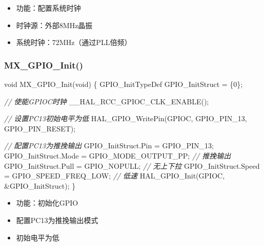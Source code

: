 \documentclass[
  chinese,
  UTF8,
  oneside,
  openany]{ctexbook}
\newenvironment{Shaded}{}{}
\newcommand{\CommentTok}[1]{\textcolor[rgb]{0.38,0.63,0.69}{\textit{#1}}}
\newcommand{\DataTypeTok}[1]{\textcolor[rgb]{0.56,0.13,0.00}{#1}}
\newcommand{\DecValTok}[1]{\textcolor[rgb]{0.25,0.63,0.44}{#1}}
\newcommand{\NormalTok}[1]{#1}
\newcommand{\OperatorTok}[1]{\textcolor[rgb]{0.40,0.40,0.40}{#1}}
\providecommand{\tightlist}{%
  \setlength{\itemsep}{0pt}\setlength{\parskip}{0pt}}
\begin{document}
\begin{itemize}
\tightlist
\item
  功能：配置系统时钟
\item
  时钟源：外部8MHz晶振
\item
  系统时钟：72MHz（通过PLL倍频）
\end{itemize}

\subsubsection{MX\_GPIO\_Init()}\label{mx_gpio_init}

\begin{Shaded}
\begin{Highlighting}[]
\DataTypeTok{void}\NormalTok{ MX\_GPIO\_Init}\OperatorTok{(}\DataTypeTok{void}\OperatorTok{)}
\OperatorTok{\{}
\NormalTok{  GPIO\_InitTypeDef GPIO\_InitStruct }\OperatorTok{=} \OperatorTok{\{}\DecValTok{0}\OperatorTok{\};}

  \CommentTok{// 使能GPIOC时钟}
\NormalTok{  \_\_HAL\_RCC\_GPIOC\_CLK\_ENABLE}\OperatorTok{();}

  \CommentTok{// 设置PC13初始电平为低}
\NormalTok{  HAL\_GPIO\_WritePin}\OperatorTok{(}\NormalTok{GPIOC}\OperatorTok{,}\NormalTok{ GPIO\_PIN\_13}\OperatorTok{,}\NormalTok{ GPIO\_PIN\_RESET}\OperatorTok{);}

  \CommentTok{// 配置PC13为推挽输出}
\NormalTok{  GPIO\_InitStruct}\OperatorTok{.}\NormalTok{Pin }\OperatorTok{=}\NormalTok{ GPIO\_PIN\_13}\OperatorTok{;}
\NormalTok{  GPIO\_InitStruct}\OperatorTok{.}\NormalTok{Mode }\OperatorTok{=}\NormalTok{ GPIO\_MODE\_OUTPUT\_PP}\OperatorTok{;}    \CommentTok{// 推挽输出}
\NormalTok{  GPIO\_InitStruct}\OperatorTok{.}\NormalTok{Pull }\OperatorTok{=}\NormalTok{ GPIO\_NOPULL}\OperatorTok{;}            \CommentTok{// 无上下拉}
\NormalTok{  GPIO\_InitStruct}\OperatorTok{.}\NormalTok{Speed }\OperatorTok{=}\NormalTok{ GPIO\_SPEED\_FREQ\_LOW}\OperatorTok{;}   \CommentTok{// 低速}
\NormalTok{  HAL\_GPIO\_Init}\OperatorTok{(}\NormalTok{GPIOC}\OperatorTok{,} \OperatorTok{\&}\NormalTok{GPIO\_InitStruct}\OperatorTok{);}
\OperatorTok{\}}
\end{Highlighting}
\end{Shaded}

\begin{itemize}
\tightlist
\item
  功能：初始化GPIO
\item
  配置PC13为推挽输出模式
\item
  初始电平为低
\end{itemize}
\end{document}
